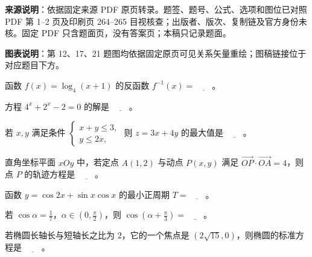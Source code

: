 


\begin{gktip}
\textbf{来源说明}：依据固定来源 PDF 原页转录。题签、题号、公式、选项和图位已对照 PDF 第 1–2 页及印刷页 264–265 目视核查；出版者、版次、复制链及官方身份未核。固定 PDF 只含题面页，没有答案页；本稿只记录题面。

\textbf{图表说明}：第 12、17、21 题图均依据固定原页可见关系矢量重绘；图稿链接位于对应题目下方。
\end{gktip}


\begin{question}
函数 $f(x)=\log_4(x+1)$ 的反函数 $f^{-1}(x)=\underline{\qquad}$。

\end{question}
\begin{question}
方程 $4^x+2^x-2=0$ 的解是 $\underline{\qquad}$。

\end{question}
\begin{question}
若 $x,y$ 满足条件 $\begin{cases}x+y\le 3,\\y\le 2x,\end{cases}$ 则 $z=3x+4y$ 的最大值是 $\underline{\qquad}$。

\end{question}
\begin{question}
直角坐标平面 $xOy$ 中，若定点 $A(1,2)$ 与动点 $P(x,y)$ 满足 $\overrightarrow{OP}\cdot\overrightarrow{OA}=4$，则点 $P$ 的轨迹方程是 $\underline{\qquad}$。

\end{question}
\begin{question}
函数 $y=\cos 2x+\sin x\cos x$ 的最小正周期 $T=\underline{\qquad}$。

\end{question}
\begin{question}
若 $\cos\alpha=\frac17$，$\alpha\in\left(0,\frac\pi2\right)$，则 $\cos\left(\alpha+\frac\pi3\right)=\underline{\qquad}$。

\end{question}
\begin{question}
若椭圆长轴长与短轴长之比为 $2$，它的一个焦点是 $(2\sqrt{15},0)$，则椭圆的标准方程是 $\underline{\qquad}$。

\end{question}
